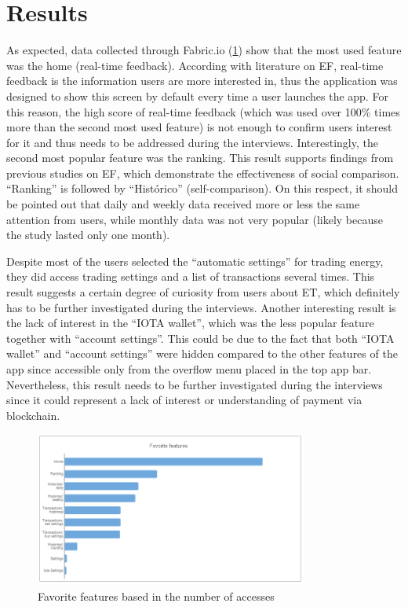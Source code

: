  \section{Results}
 As expected, data collected through Fabric.io (\cref{fig:gr1}) show that the most used feature was the home (real-time feedback). According with literature on \ac{EF}, real-time feedback is the information users are more interested in, thus the application was designed to show this screen by default every time a user launches the app. For this reason, the high score of real-time feedback (which was used over 100\% times more than the second most used feature) is not enough to confirm users interest for it and thus needs to be addressed during the interviews. Interestingly, the second most popular feature was the ranking. This result supports findings from previous studies on \ac{EF}, which demonstrate the effectiveness of social comparison. “Ranking” is followed by  “Histórico” (self-comparison). On this respect, it should be pointed out that daily and weekly data received more or less the same attention from users, while monthly data was not very popular (likely because the study lasted only one month).


Despite most of the users selected the “automatic settings” for trading energy,  they did access trading settings and a list of transactions several times. This result suggests a certain degree of curiosity from users about \ac{ET}, which definitely has to be further investigated during the interviews. Another interesting result is the lack of interest in the “IOTA wallet”, which was the less popular feature together with “account settings”. This could be due to the fact that both “IOTA wallet” and “account settings” were hidden compared to the other features of the app since accessible only from the overflow menu placed in the top app bar. Nevertheless, this result needs to be further investigated during the interviews since it could represent a lack of interest or understanding of payment via blockchain. 

 
 \begin{figure}[h]
\centering
\includegraphics[width=0.8\textwidth]{./Images/graph1}
\caption{Favorite features based in the number of accesses}
\label{fig:gr1}
\end{figure}

